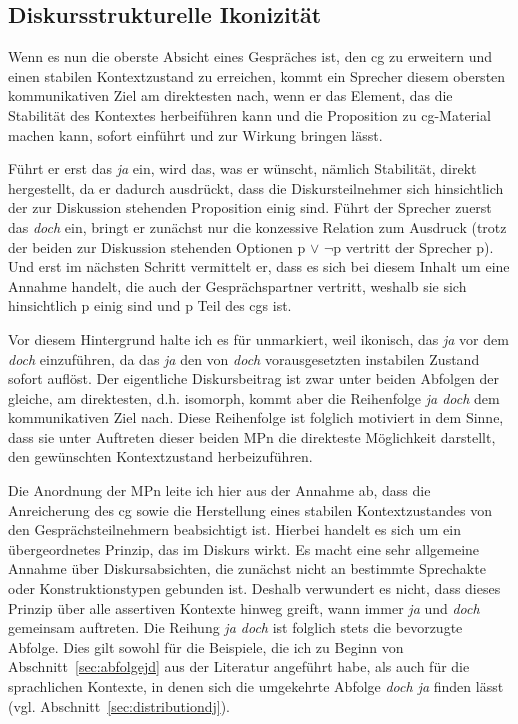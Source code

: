 \subsection{Diskursstrukturelle Ikonizität}
Wenn es nun die oberste Absicht eines Gespräches ist, den cg zu erweitern und einen stabilen Kontextzustand zu erreichen, kommt ein Sprecher diesem obersten kommunikativen Ziel am direktesten nach, wenn er das Element, das die Stabilität des Kontextes herbeiführen kann und die Proposition zu cg-Material machen kann, sofort einführt und zur Wirkung bringen lässt.

Führt er erst das \textit{ja} ein, wird das, was er wünscht, nämlich Stabilität, direkt hergestellt, da er dadurch ausdrückt, dass die Diskursteilnehmer sich hinsichtlich der zur Diskussion stehenden Proposition einig sind. Führt der Sprecher zuerst das \textit{doch} ein, bringt er zunächst nur die konzessive Relation zum Ausdruck (trotz der beiden zur Diskussion stehenden Optionen p $\vee$ $\neg$p vertritt der Sprecher p). Und erst im nächsten Schritt vermittelt er, dass es sich bei diesem Inhalt um eine Annahme handelt, die auch der Gesprächspartner vertritt, weshalb sie sich hinsichtlich p einig sind und p Teil des cgs ist. 

Vor diesem Hintergrund halte ich es für unmarkiert, weil ikonisch, das \textit{ja} vor dem \textit{doch} einzuführen, da das \textit{ja} den von \textit{doch} vorausgesetzten instabilen Zustand sofort auflöst. Der eigentliche Diskursbeitrag ist zwar unter beiden Abfolgen der gleiche, am direktesten, d.h.  isomorph, kommt aber die Reihenfolge \textit{ja doch} dem kommunikativen Ziel nach. Diese Reihenfolge ist folglich motiviert in dem Sinne, dass sie unter Auftreten dieser beiden MPn die direkteste Möglichkeit darstellt, den gewünschten Kontextzustand herbeizuführen.

Die Anordnung der MPn leite ich hier aus der Annahme ab, dass die Anrei\-cherung des cg sowie die Herstellung eines stabilen Kontextzustandes von den Gesprächsteilnehmern beabsichtigt ist. Hierbei handelt es sich um ein übergeordnetes Prinzip, das im Diskurs wirkt. Es macht eine sehr allgemeine Annahme über Diskursabsichten, die zunächst nicht an bestimmte Sprechakte oder Konstruktionstypen gebunden ist. Deshalb verwundert es nicht, dass dieses Prinzip über alle assertiven Kontexte hinweg greift, wann immer \textit{ja} und \textit{doch} gemeinsam auftreten. Die Reihung \textit{ja doch} ist folglich stets die bevorzugte Abfolge. Dies gilt sowohl für die Beispiele, die ich zu Beginn von Abschnitt~\ref{sec:abfolgejd} aus der Literatur angeführt habe, als auch für die sprachlichen Kontexte, in denen sich die umgekehrte Abfolge \textit{doch ja} finden lässt (vgl. Abschnitt~\ref{sec:distributiondj}). 

